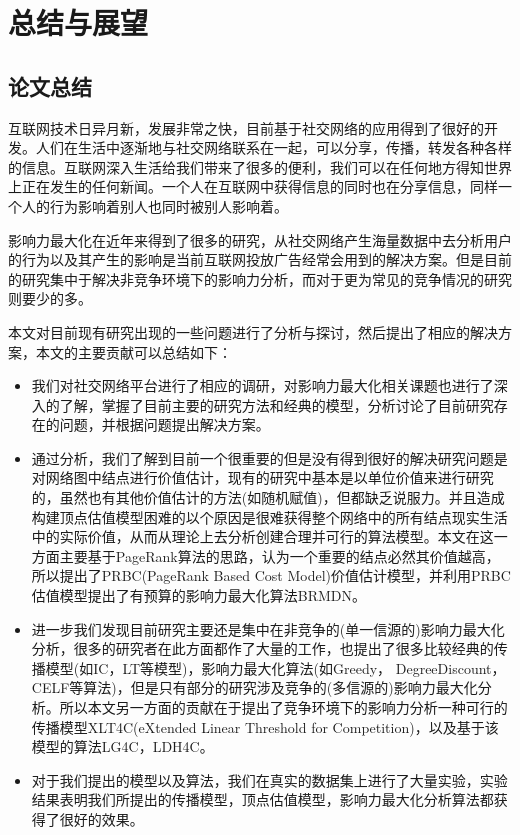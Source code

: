 

\chapter{总结与展望}
\label{cha:5thChap}

\section{论文总结}
互联网技术日异月新，发展非常之快，目前基于社交网络的应用得到了很好的开发。人们在生活中逐渐地与社交网络联系在一起，可以分享，传播，转发各种各样的信息。互联网深入生活给我们带来了很多的便利，我们可以在任何地方得知世界上正在发生的任何新闻。一个人在互联网中获得信息的同时也在分享信息，同样一个人的行为影响着别人也同时被别人影响着。

影响力最大化在近年来得到了很多的研究，从社交网络产生海量数据中去分析用户的行为以及其产生的影响是当前互联网投放广告经常会用到的解决方案。但是目前的研究集中于解决非竞争环境下的影响力分析，而对于更为常见的竞争情况的研究则要少的多。

本文对目前现有研究出现的一些问题进行了分析与探讨，然后提出了相应的解决方案，本文的主要贡献可以总结如下：

\begin{itemize}
\item 我们对社交网络平台进行了相应的调研，对影响力最大化相关课题也进行了深入的了解，掌握了目前主要的研究方法和经典的模型，分析讨论了目前研究存在的问题，并根据问题提出解决方案。
\item 通过分析，我们了解到目前一个很重要的但是没有得到很好的解决研究问题是对网络图中结点进行价值估计，现有的研究中基本是以单位价值来进行研究的，虽然也有其他价值估计的方法(如随机赋值)，但都缺乏说服力。并且造成构建顶点估值模型困难的以个原因是很难获得整个网络中的所有结点现实生活中的实际价值，从而从理论上去分析创建合理并可行的算法模型。本文在这一方面主要基于PageRank算法的思路，认为一个重要的结点必然其价值越高，所以提出了PRBC(PageRank Based Cost Model)价值估计模型，并利用PRBC估值模型提出了有预算的影响力最大化算法BRMDN。
\item 进一步我们发现目前研究主要还是集中在非竞争的(单一信源的)影响力最大化分析，很多的研究者在此方面都作了大量的工作，也提出了很多比较经典的传播模型(如IC，LT等模型)，影响力最大化算法(如Greedy， DegreeDiscount，CELF等算法)，但是只有部分的研究涉及竞争的(多信源的)影响力最大化分析。所以本文另一方面的贡献在于提出了竞争环境下的影响力分析一种可行的传播模型XLT4C(eXtended Linear Threshold for Competition)，以及基于该模型的算法LG4C，LDH4C。
\item 对于我们提出的模型以及算法，我们在真实的数据集上进行了大量实验，实验结果表明我们所提出的传播模型，顶点估值模型，影响力最大化分析算法都获得了很好的效果。
\end{itemize}

